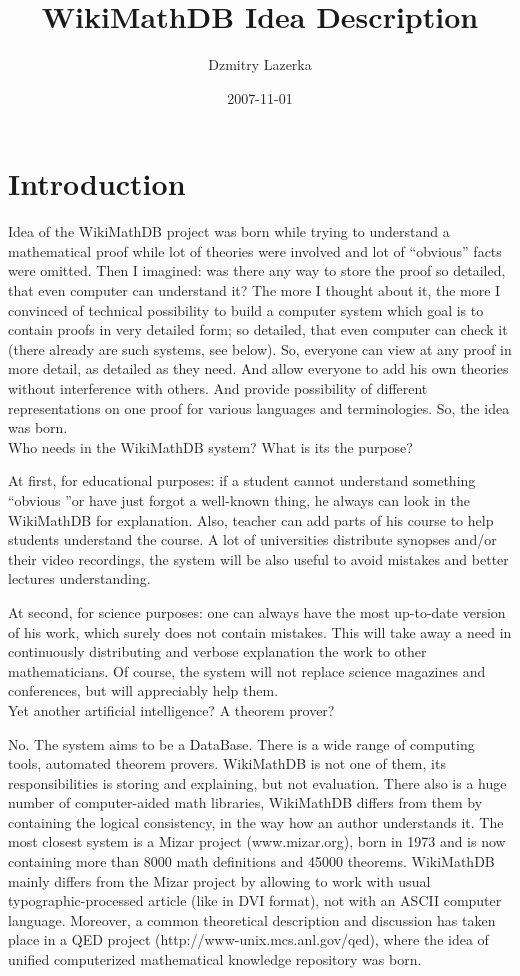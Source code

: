 \documentclass{article}
\title {WikiMathDB Idea Description}
\author{Dzmitry Lazerka}
\date{2007-11-01}
\begin{document}
\maketitle


\section{Introduction}

Idea of the WikiMathDB project was born while trying to understand a
mathematical proof while lot of theories were involved and lot of
``obvious'' facts were omitted. Then I imagined: was there any way
to store the proof so detailed, that even computer can understand
it? The more I thought about it, the more I convinced of technical
possibility to build a computer system which goal is to contain
proofs in very detailed form; so detailed, that even computer can
check it (there already are such systems, see below). So, everyone
can view at any proof in more detail, as detailed as they need. And
allow everyone to add his own theories without interference with
others. And provide possibility of different representations on one
proof for various languages and terminologies. So, the idea was born.\\

Who needs in the WikiMathDB system? What is its the purpose?

At first, for educational purposes: if a student cannot understand
something ``obvious ''or have just forgot a well-known thing, he
always can look in the WikiMathDB for explanation. Also, teacher can
add parts of his course to help students understand the course. A
lot of universities distribute synopses and/or their video
recordings, the system will be also useful to avoid mistakes and
better lectures understanding.

At second, for science purposes: one can always have the most
up-to-date version of his work, which surely does not contain
mistakes. This will take away a need in continuously distributing
and verbose explanation the work to other mathematicians. Of course,
the system will not replace science magazines and conferences, but
will appreciably help them.\\


Yet another artificial intelligence? A theorem prover?

No. The system aims to be a DataBase. There is a wide range of
computing tools, automated theorem provers. WikiMathDB is not one of
them, its responsibilities is storing and explaining, but not
evaluation. There also is a huge number of computer-aided math
libraries, WikiMathDB differs from them by containing the logical
consistency, in the way how an author understands it. The most
closest system is a Mizar project (www.mizar.org), born in 1973 and
is now containing more than 8000 math definitions and 45000
theorems. WikiMathDB mainly differs from the Mizar project by
allowing to work with usual typographic-processed article (like in
DVI format), not with an ASCII computer language. Moreover, a common
theoretical description and discussion has taken place in a QED
project (http://www-unix.mcs.anl.gov/qed), where the idea of unified
computerized mathematical knowledge repository was born.
\end{document}
